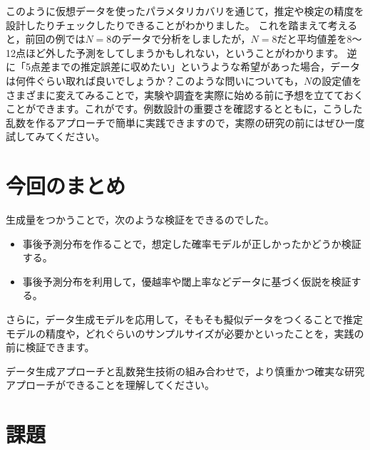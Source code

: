 \documentclass{ltjsbook}
\begin{document}
このように仮想データを使ったパラメタリカバリを通じて，推定や検定の精度を設計したりチェックしたりできることがわかりました。
これを踏まえて考えると，前回の例では$N=8$のデータで分析をしましたが，$N=8$だと平均値差を8〜12点ほど外した予測をしてしまうかもしれない，ということがわかります。
逆に「5点差までの推定誤差に収めたい」というような希望があった場合，データは何件ぐらい取れば良いでしょうか？このような問いについても，$N$の設定値をさまざまに変えてみることで，実験や調査を実際に始める前に予想を立てておくことができます。これがです。例数設計の重要さを確認するとともに，こうした乱数を作るアプローチで簡単に実践できますので，実際の研究の前にはぜひ一度試してみてください。

\section{今回のまとめ}
生成量をつかうことで，次のような検証をできるのでした。
\begin{itemize}
	\item 事後予測分布を作ることで，想定した確率モデルが正しかったかどうか検証する。
	\item 事後予測分布を利用して，優越率や閾上率などデータに基づく仮説を検証する。
\end{itemize}
さらに，データ生成モデルを応用して，そもそも擬似データをつくることで推定モデルの精度や，どれぐらいのサンプルサイズが必要かといったことを，実践の前に検証できます。

データ生成アプローチと乱数発生技術の組み合わせで，より慎重かつ確実な研究アプローチができることを理解してください。

\section{課題}

\end{document}
